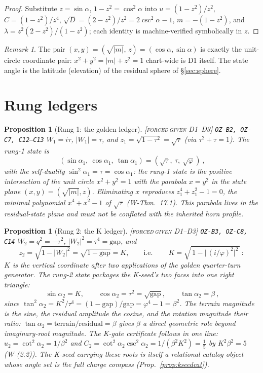 \documentclass[11pt]{article}
\newcommand{\tagFD}{\textcolor{cF}{\textsc{[forced}}\,\textcolor{cD}{\textsc{given D1--D3]}}}
\newcommand{\hx}[1]{\textcolor{cC}{\footnotesize\texttt{#1}}}
\newcommand{\gp}{\varphi}
\newcommand{\gapc}{\mathrm{gap}}
\theoremstyle{plain}
\newtheorem{proposition}[theorem]{Proposition}
\theoremstyle{definition}
\theoremstyle{remark}
\newtheorem{remark}[theorem]{Remark}
\begin{document}
\begin{proof}
Substitute $z=\sin\alpha$, $1-z^2=\cos^2\alpha$ into $u=(1-z^2)/z^2$,
$C=(1-z^2)/z^4$, $\sqrt D=(2-z^2)/z^2=2\csc^2\alpha-1$,
$m=-(1-z^2)$, and $\lambda=z^2(2-z^2)/(1-z^2)$; each identity is
machine-verified symbolically in $z$.
\end{proof}

\begin{remark}
The pair $(x,y)=(\sqrt{|m|},\,z)=(\cos\alpha,\sin\alpha)$ is exactly the
unit-circle coordinate pair: $x^2+y^2=|m|+z^2=1$ chart-wide is D1 itself.
The state angle is the latitude (elevation) of the residual sphere of
\S\ref{sec:sphere}.
\end{remark}

\section{Rung ledgers}\label{sec:ledgers}

\begin{proposition}[Rung 1: the golden ledger]\label{prop:rung1}\tagFD{} \hx{OZ-B2, OZ-C7, C12--C13}
$W_1=i\tau$, $|W_1|=\tau$, and $z_1=\sqrt{1-\tau^2}=\sqrt\tau$ (via
$\tau^2+\tau=1$). The rung-1 state is
\[
\boxed{\ (\sin\alpha_1,\ \cos\alpha_1,\ \tan\alpha_1)=(\sqrt\tau,\ \tau,\ \sqrt\gp)\ },
\]
with the self-duality $\sin^2\alpha_1=\tau=\cos\alpha_1$: the rung-1 state is the
positive intersection of the unit circle $x^2+y^2=1$ with the parabola $x=y^2$ in
the state plane $(x,y)=(\sqrt{|m|},z)$. Eliminating $x$ reproduces
$z_1^4+z_1^2-1=0$, the minimal polynomial $x^4+x^2-1$ of $\sqrt\tau$
(W-Thm.\ 17.1). This parabola lives in the residual-state plane and must not be
conflated with the inherited horn profile.
\end{proposition}

\begin{proposition}[Rung 2: the K ledger]\label{prop:rung2}\tagFD{} \hx{OZ-B3, OZ-C8, C14}
$W_2=q^2=-\tau^2$, $|W_2|^2=\tau^4=\gapc$, and
\[
z_2=\sqrt{1-|W_2|^2}=\sqrt{1-\gapc}=K,
\qquad\text{i.e.}\qquad
\boxed{\ K=\sqrt{\,1-\bigl|\,(i/\gp)^2\bigr|^2\,}\ }:
\]
$K$ is the vertical coordinate after two applications of the golden quarter-turn
generator. The rung-2 state packages the K-seed's two faces into one right
triangle:
\[
\boxed{\ \sin\alpha_2=K,\qquad \cos\alpha_2=\tau^2=\sqrt{\gapc},\qquad
\tan\alpha_2=\beta\ },
\]
since $\tan^2\alpha_2=K^2/\tau^4=(1-\gapc)/\gapc=\gp^4-1=\beta^2$. The terrain
magnitude is the sine, the residual amplitude the cosine, and the rotation
magnitude their ratio: $\tan\alpha_2=\text{terrain}/\text{residual}=\beta$ gives
$\beta$ a direct geometric role beyond imaginary-root magnitude. The K-gate
certificate follows in one line:
$u_2=\cot^2\alpha_2=1/\beta^2$ and
$C_2=\cot^2\alpha_2\csc^2\alpha_2=1/(\beta^2K^2)=\tfrac15$ by $K^2\beta^2=5$
(W-(2.2)). The K-seed carrying these roots is itself a relational catalog
object whose angle set is the full charge compass
(Prop.~\ref{prop:kseedcat}).
\end{proposition}
\end{document}
